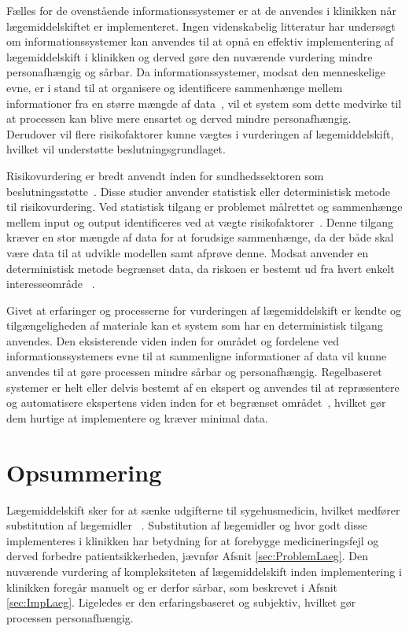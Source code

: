 Fælles for de ovenstående informationssystemer er at de anvendes i klinikken når lægemiddelskiftet er implementeret. Ingen videnskabelig litteratur har undersøgt om informationssystemer kan anvendes til at opnå en effektiv implementering af lægemiddelskift i klinikken og derved gøre den nuværende vurdering mindre personafhængig og sårbar. Da informationssystemer, modsat den menneskelige evne, er i stand til at organisere og identificere sammenhænge mellem informationer fra en større mængde af data~\citep{Agrawal2009}, vil et system som dette medvirke til at processen kan blive mere ensartet og derved mindre personafhængig. Derudover vil flere risikofaktorer kunne vægtes i vurderingen af lægemiddelskift, hvilket vil understøtte beslutningsgrundlaget.  

Risikovurdering er bredt anvendt inden for sundhedssektoren som beslutningsstøtte~\citep{Geissert2018, Boyko1990, Rawshani2018}. Disse studier anvender statistisk eller deterministisk metode til risikovurdering. Ved statistisk tilgang er problemet målrettet og sammenhænge mellem input og output identificeres ved at vægte risikofaktorer~\citep{Bruce2007}. Denne tilgang kræver en stor mængde af data for at forudsige sammenhænge, da der både skal være data til at udvikle modellen samt afprøve denne.  Modsat anvender en deterministisk metode begrænset data, da riskoen er bestemt ud fra hvert enkelt interesseområde
~\citep{Bruce2007}. 

Givet at erfaringer og processerne for vurderingen af lægemiddelskift er kendte og tilgængeligheden af materiale kan et system som har en deterministisk tilgang anvendes. Den eksisterende viden inden for området og fordelene ved informationssystemers evne til at sammenligne informationer af data vil kunne anvendes til at gøre processen mindre sårbar og personafhængig. Regelbaseret systemer er helt eller delvis bestemt af en ekspert og anvendes til at repræsentere og automatisere ekspertens viden inden for et begrænset området~\citep{Crina2008}, hvilket gør dem hurtige at implementere og kræver minimal data. 


\section{Opsummering}
Lægemiddelskift sker for at sænke udgifterne til sygehusmedicin, hvilket medfører substitution af lægemidler ~\citep{Ess2003, Johnston2011}. Substitution af lægemidler og hvor godt disse implementeres i klinikken har betydning for at forebygge medicineringsfejl og derved forbedre patientsikkerheden, jævnfør Afsnit \ref{sec:ProblemLaeg}. Den nuværende vurdering af kompleksiteten af lægemiddelskift inden implementering i klinikken foregår manuelt og er derfor sårbar, som beskrevet i Afsnit \ref{sec:ImpLaeg}. Ligeledes er den erfaringsbaseret og subjektiv, hvilket gør processen personafhængig.

